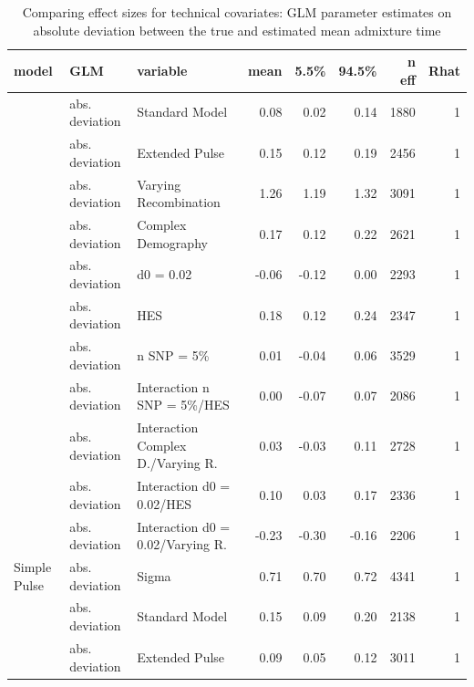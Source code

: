 \documentclass[11pt]{article}
\begin{document}
\begin{table}[H]
\fontsize{8}{9}\selectfont
\caption{\label{tab:table_Supplements_ests_deviation}Comparing effect sizes for technical covariates: GLM parameter estimates on absolute deviation between  the true and estimated mean admixture time}
\centering
\begin{tabular}[t]{l|l|l|r|r|r|r|r}
\hline
model & GLM & variable & mean & 5.5\% & 94.5\% & n eff & Rhat\\
\hline
 & abs. deviation & Standard Model & 0.08 & 0.02 & 0.14 & 1880 & 1\\

 & abs. deviation & Extended Pulse & 0.15 & 0.12 & 0.19 & 2456 & 1\\

 & abs. deviation & Varying Recombination & 1.26 & 1.19 & 1.32 & 3091 & 1\\

 & abs. deviation & Complex Demography & 0.17 & 0.12 & 0.22 & 2621 & 1\\

 & abs. deviation & d0 = 0.02 & -0.06 & -0.12 & 0.00 & 2293 & 1\\

 & abs. deviation & HES & 0.18 & 0.12 & 0.24 & 2347 & 1\\

 & abs. deviation & n SNP = 5\% & 0.01 & -0.04 & 0.06 & 3529 & 1\\

 & abs. deviation & Interaction n SNP = 5\%/HES & 0.00 & -0.07 & 0.07 & 2086 & 1\\

 & abs. deviation & Interaction Complex D./Varying R. & 0.03 & -0.03 & 0.11 & 2728 & 1\\

 & abs. deviation & Interaction d0 = 0.02/HES & 0.10 & 0.03 & 0.17 & 2336 & 1\\

 & abs. deviation & Interaction d0 = 0.02/Varying R. & -0.23 & -0.30 & -0.16 & 2206 & 1\\

\multirow{-12}{*}{\raggedright\arraybackslash Simple Pulse} & abs. deviation & Sigma & 0.71 & 0.70 & 0.72 & 4341 & 1\\
\cline{1-8}
 & abs. deviation & Standard Model & 0.15 & 0.09 & 0.20 & 2138 & 1\\

 & abs. deviation & Extended Pulse & 0.09 & 0.05 & 0.12 & 3011 & 1\\


\end{tabular}
\end{table}
\end{document}

